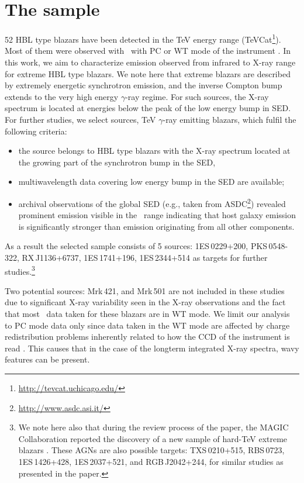 \section{The sample} \label{sample}
52 HBL type blazars have been detected in the TeV energy range (TeVCat\footnote{\url{http://tevcat.uchicago.edu/}}).
Most of them were observed with \xrt\ with PC or WT mode of the instrument \citep[see for detail][]{Wierzcholska2016}.
In this work, we aim to characterize emission observed from infrared to X-ray range for extreme HBL type blazars. 
We note here that extreme blazars are described by extremely energetic synchrotron emission, and the inverse Compton bump extends to the very high energy $\gamma$-ray regime. 
For such sources, the X-ray spectrum is located at energies below the peak of the low energy bump in SED.
For further studies, we select sources, TeV $\gamma$-ray emitting blazars, which fulfil the following criteria:
\begin{itemize}
 \item the source belongs to HBL type blazars with the X-ray spectrum located at the growing part of the synchrotron bump in the SED,
  \item multiwavelength data covering low energy bump in the SED are available;
 \item archival observations of the global SED (e.g., taken from ASDC\footnote{\url{http://www.asdc.asi.it/}})  revealed prominent emission visible in the \itu\ range indicating that host galaxy emission is significantly stronger than emission originating from all other components.
\end{itemize}
As a result the selected sample consists of 5 sources: 1ES\,0229+200, PKS\,0548-322, RX\,J1136+6737, 1ES\,1741+196, 1ES\,2344+514 as targets for further studies.\footnote{We note here also that during the review process of the paper, the MAGIC Collaboration reported the discovery of a new sample of hard-TeV extreme blazars \citep{MAGIC_extreme}. These AGNs are also possible targets: TXS\,0210+515, RBS\,0723, 1ES\,1426+428, 1ES\,2037+521, and RGB\,J2042+244, for similar studies as presented in the paper.}

Two potential sources: Mrk\,421, and Mrk\,501 are not included in these studies due to significant X-ray variability seen in the X-ray observations and the fact that most \xrt\ data taken for these blazars are in WT mode. 
We limit our analysis to PC mode data only since data  taken in the WT mode are affected by charge redistribution problems inherently related to how the CCD of the instrument is read \citep[also noted by, e.g.][]{Massaro2008, Wierzcholska2016}. This causes that in the case of the longterm integrated X-ray spectra, wavy features can be present. 


